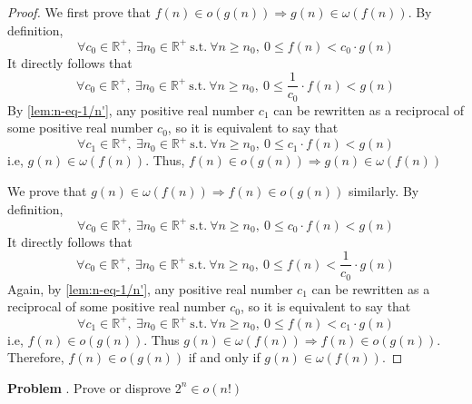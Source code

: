 \documentclass[11pt]{article}
\newcommand{\bb}[1]{\mathbb{#1}}
\newcounter{problem}
\newcommand{\problem}[1]{
    \refstepcounter{problem}
    \noindent\textbf{Problem \theproblem}. #1
}
\theoremstyle{claim}
\begin{document}
\begin{proof}
We first prove that \(f(n) \in o(g(n)) \Rightarrow g(n) \in \omega(f(n))\). By definition,
\[
    \forall c_0 \in \bb{R}^+,\: \exists n_0 \in \bb{R}^+\ \text{s.t.}\ \forall n \geq n_0,\: 0 \leq f(n) < c_0 \cdot g(n)
\]
It directly follows that
\[
    \forall c_0 \in \bb{R}^+,\: \exists n_0 \in \bb{R}^+\ \text{s.t.}\ \forall n \geq n_0,\: 0 \leq \frac{1}{c_0} \cdot f(n) < g(n)
\]
By \cref{lem:n-eq-1/n'}, any positive real number \(c_1\) can be rewritten as a reciprocal of some positive real number \(c_0\), so it is equivalent to say that
\[
    \forall c_1 \in \bb{R}^+,\: \exists n_0 \in \bb{R}^+\ \text{s.t.}\ \forall n \geq n_0,\: 0 \leq c_1 \cdot f(n) < g(n)
\]
i.e, \(g(n) \in \omega(f(n))\). Thus, \(f(n) \in o(g(n)) \Rightarrow g(n) \in \omega(f(n))\)

\vspace{.5em}

We prove that \(g(n) \in \omega(f(n)) \Rightarrow f(n) \in o(g(n))\) similarly. By definition,
\[
    \forall c_0 \in \bb{R}^+,\: \exists n_0 \in \bb{R}^+\ \text{s.t.}\ \forall n \geq n_0,\: 0 \leq c_0 \cdot f(n) < g(n)
\]
It directly follows that
\[
    \forall c_0 \in \bb{R}^+,\: \exists n_0 \in \bb{R}^+\ \text{s.t.}\ \forall n \geq n_0,\: 0 \leq f(n) < \frac{1}{c_0} \cdot g(n)
\]
Again, by \cref{lem:n-eq-1/n'}, any positive real number \(c_1\) can be rewritten as a reciprocal of some positive real number \(c_0\), so it is equivalent to say that
\[
    \forall c_1 \in \bb{R}^+,\: \exists n_0 \in \bb{R}^+\ \text{s.t.}\ \forall n \geq n_0,\: 0 \leq f(n) < c_1 \cdot g(n)
\]
i.e, \(f(n) \in o(g(n))\). Thus \(g(n) \in \omega(f(n)) \Rightarrow f(n) \in o(g(n))\). Therefore, \(f(n) \in o(g(n))\) if and only if \(g(n) \in \omega(f(n))\).
\end{proof}

\pagebreak

\problem{%
    Prove or disprove \(2^n \in o(n!)\)
}
\end{document}
